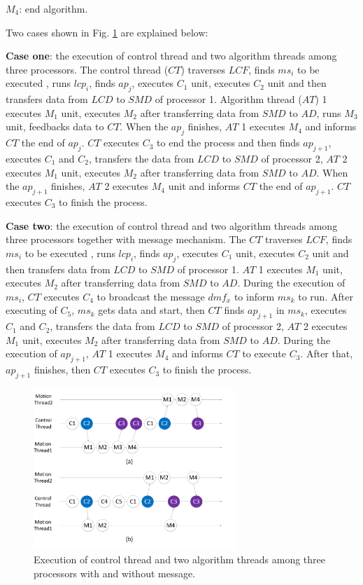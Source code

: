\documentclass[journal,UTF8]{IEEEtran}
\begin{document}
 \textbf{$M_{4}$}: end algorithm.
  
  Two cases shown in Fig. \ref{fig:threadFlow} are explained below:
  
  \textbf{Case one}: the execution of control thread and two algorithm threads among three processors. The control thread ($CT$) traverses $LCF$, finds $ms_i$ to be executed , runs $lcp_i$, finds $ap_j$, executes $C_1$ unit, executes $C_2$ unit and then transfers data from $LCD$ to $SMD$ of processor 1. Algorithm thread ($AT$) 1 executes $M_1$ unit, executes $M_2$ after transferring data from $SMD$ to $AD$, runs $M_3$ unit, feedbacks data to $CT$. When the $ap_j$ finishes, $AT$ 1 executes $M_4$ and informs $CT$ the end of $ap_j$. $CT$ executes $C_3$ to end the process and then finds $ap_{j+1}$, executes $C_1$ and $C_2$, transfers the data from $LCD$ to $SMD$ of processor 2, $AT$ 2 executes $M_1$ unit, executes $M_2$ after transferring data from $SMD$ to $AD$. When the $ap_{j+1}$ finishes, $AT$ 2 executes $M_4$ unit and informs $CT$ the end of $ap_{j+1}$. $CT$ executes $C_3$ to finish the process.
  
  \textbf{Case two}: the execution of control thread and two algorithm threads among three processors together with message mechanism. The $CT$ traverses $LCF$, finds $ms_i$ to be executed , runs $lcp_i$, finds $ap_j$, executes $C_1$ unit, executes $C_2$ unit and then transfers data from $LCD$ to $SMD$ of processor 1. $AT$ 1 executes $M_1$ unit, executes $M_2$ after transferring data from $SMD$ to $AD$. During the execution of $ms_i$, $CT$ executes $C_4$ to broadcast the message $dmf_x$ to inform $ms_{k}$ to run. After executing of $C_5$, $ms_{k}$ gets data and start, then $CT$ finds $ap_{j+1}$ in $ms_{k}$, executes $C_1$ and $C_2$, transfers the data from $LCD$ to $SMD$ of processor 2, $AT$ 2 executes $M_1$ unit, executes $M_2$ after transferring data from $SMD$ to $AD$. During the execution of $ap_{j+1}$, $AT$ 1 executes $M_4$ and informs $CT$ to execute $C_3$. After that, $ap_{j+1}$ finishes, then $CT$ executes $C_3$ to finish the process.
  

  
  \begin{figure}
  	\centering
  	\includegraphics[width=3in]{fig/threadFlow.pdf}
  	\caption{ Execution of control thread and two algorithm threads among three processors with and without message.}
  	\label{fig:threadFlow}
  \end{figure}
\end{document}
